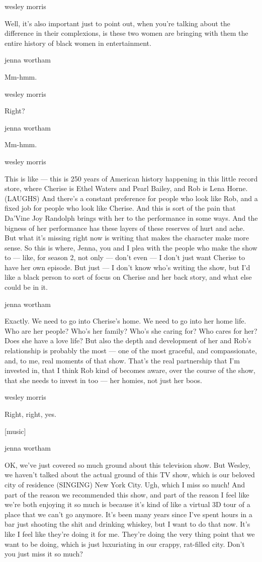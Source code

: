wesley morris

Well, it's also important just to point out, when you're talking about
the difference in their complexions, is these two women are bringing
with them the entire history of black women in entertainment.

jenna wortham

Mm-hmm.

wesley morris

Right?

jenna wortham

Mm-hmm.

wesley morris

This is like --- this is 250 years of American history happening in this
little record store, where Cherise is Ethel Waters and Pearl Bailey, and
Rob is Lena Horne. (LAUGHS) And there's a constant preference for people
who look like Rob, and a fixed job for people who look like Cherise. And
this is sort of the pain that Da'Vine Joy Randolph brings with her to
the performance in some ways. And the bigness of her performance has
these layers of these reserves of hurt and ache. But what it's missing
right now is writing that makes the character make more sense. So this
is where, Jenna, you and I plea with the people who make the show to ---
like, for season 2, not only --- don't even --- I don't just want
Cherise to have her own episode. But just --- I don't know who's writing
the show, but I'd like a black person to sort of focus on Cherise and
her back story, and what else could be in it.

jenna wortham

Exactly. We need to go into Cherise's home. We need to go into her home
life. Who are her people? Who's her family? Who's she caring for? Who
cares for her? Does she have a love life? But also the depth and
development of her and Rob's relationship is probably the most --- one
of the most graceful, and compassionate, and, to me, real moments of
that show. That's the real partnership that I'm invested in, that I
think Rob kind of becomes aware, over the course of the show, that she
needs to invest in too --- her homies, not just her boos.

wesley morris

Right, right, yes.

{[}music{]}

jenna wortham

OK, we've just covered so much ground about this television show. But
Wesley, we haven't talked about the actual ground of this TV show, which
is our beloved city of residence (SINGING) New York City. Ugh, which I
miss so much! And part of the reason we recommended this show, and part
of the reason I feel like we're both enjoying it so much is because it's
kind of like a virtual 3D tour of a place that we can't go anymore. It's
been many years since I've spent hours in a bar just shooting the shit
and drinking whiskey, but I want to do that now. It's like I feel like
they're doing it for me. They're doing the very thing point that we want
to be doing, which is just luxuriating in our crappy, rat-filled city.
Don't you just miss it so much?

